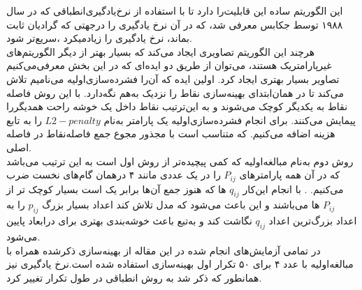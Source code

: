 این الگوریتم ساده این قابلیت‌را دارد تا با استفاده از  نرخ‌یادگیری‌انطباقی که در سال ۱۹۸۸ توسط جکابس معرفی شد، که در آن نرخ یادگیری را درجهتی که گرادیان ثابت بماند، نرخ یادگیری را زیاد‌میکرد ،سریع‌تر شود.
\\
هرچند این الگوریتم تصاویری ایجاد می‌کند که بسیار بهتر از دیگر الگوریتم‌های غیر‌پارامتریک هستند،  می‌توان از طریق دو ایده‌ای که در این بخش معرفی‌می‌کنیم تصاویر بسیار بهتری ایجاد کرد.
اولین ایده که آن‌را فشرده‌سازی‌اولیه  می‌نامیم تلاش می‌کند تا در همان‌ابتدای بهینه‌سازی نقاط را نزدیک به‌هم نگه‌دارد. با این روش فاصله نقاط به یکدیگر کوچک می‌شوند و به این‌ترتیب نقاط داخل یک خوشه راحت همدیگر‌را پیمایش می‌کنند. برای انجام فشرده‌سازی‌اولیه یک پارامتر به‌نام $L2-penalty$ را به تابع هزینه اضافه می‌کنیم. که متناسب است با مجذور مجوع جمع فاصله‌نقاط در فاصله اصلی. 
\\
روش دوم به‌نام  مبالغه‌اولیه  که کمی پیچیده‌تر از روش اول است به این ترتیب می‌باشد که در آن همه پارامتر‌های
$P_{ij}$
را در یک عددی مانند ۴ در‌همان گام‌های نخست ضرب می‌کنیم.
. با انجام این‌کار 
$q_{ij}$
ها که هنوز جمع آن‌ها برابر یک است بسیار کوچک تر از 
$P_{ij}$
ها می‌باشند و این باعث می‌شود که مدل تلاش کند اعداد بسیار بزرگ
$p_{ij}$
را به اعداد بزرگ‌ترین اعداد 
$q_{ij}$
نگاشت کند و به‌تبع باعث خوشه‌بندی بهتری برای در‌ابعاد پایین می‌شود.
\\
در تمامی آزمایش‌های انجام شده در این مقاله از بهینه‌سازی ذکر‌شده همراه با مبالغه‌اولیه با عدد ۴ برای ۵۰ تکرار اول بهینه‌سازی استفاده شده است.نرخ یادگیری نیز همانطور که ذکر شد به روش انطباقی در طول تکرار تغییر کرد.
